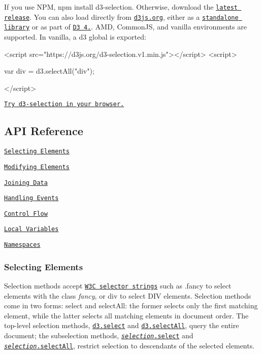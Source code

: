 If you use N\+PM, {\ttfamily npm install d3-\/selection}. Otherwise, download the \href{https://github.com/d3/d3-selection/releases/latest}{\tt latest release}. You can also load directly from \href{https://d3js.org}{\tt d3js.\+org}, either as a \href{https://d3js.org/d3-selection.v1.min.js}{\tt standalone library} or as part of \href{https://github.com/d3/d3}{\tt D3 4.}. A\+MD, Common\+JS, and vanilla environments are supported. In vanilla, a {\ttfamily d3} global is exported\+:


\begin{DoxyCode}
<script src="https://d3js.org/d3-selection.v1.min.js"></script>
<script>

var div = d3.selectAll("div");

</script>
\end{DoxyCode}


\href{https://tonicdev.com/npm/d3-selection}{\tt Try d3-\/selection in your browser.}

\subsection*{A\+PI Reference}


\begin{DoxyItemize}
\item \href{#selecting-elements}{\tt Selecting Elements}
\item \href{#modifying-elements}{\tt Modifying Elements}
\item \href{#joining-data}{\tt Joining Data}
\item \href{#handling-events}{\tt Handling Events}
\item \href{#control-flow}{\tt Control Flow}
\item \href{#local-variables}{\tt Local Variables}
\item \href{#namespaces}{\tt Namespaces}
\end{DoxyItemize}

\subsubsection*{Selecting Elements}

Selection methods accept \href{http://www.w3.org/TR/selectors-api/}{\tt W3C selector strings} such as {\ttfamily .fancy} to select elements with the class {\itshape fancy}, or {\ttfamily div} to select D\+IV elements. Selection methods come in two forms\+: select and select\+All\+: the former selects only the first matching element, while the latter selects all matching elements in document order. The top-\/level selection methods, \href{#select}{\tt d3.\+select} and \href{#selectAll}{\tt d3.\+select\+All}, query the entire document; the subselection methods, \href{#selection_select}{\tt {\itshape selection}.select} and \href{#selection_selectAll}{\tt {\itshape selection}.select\+All}, restrict selection to descendants of the selected elements.

